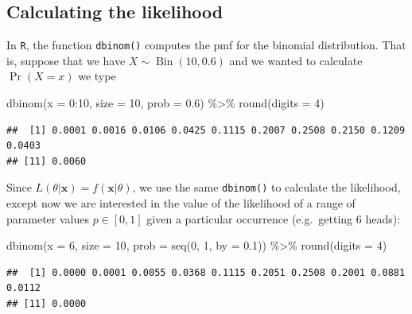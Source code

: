 \documentclass[
]{book}
\newenvironment{Shaded}{\begin{snugshade}}{\end{snugshade}}
\newcommand{\AttributeTok}[1]{\textcolor[rgb]{0.77,0.63,0.00}{#1}}
\newcommand{\DecValTok}[1]{\textcolor[rgb]{0.00,0.00,0.81}{#1}}
\newcommand{\FloatTok}[1]{\textcolor[rgb]{0.00,0.00,0.81}{#1}}
\newcommand{\FunctionTok}[1]{\textcolor[rgb]{0.00,0.00,0.00}{#1}}
\newcommand{\NormalTok}[1]{#1}
\newcommand{\SpecialCharTok}[1]{\textcolor[rgb]{0.00,0.00,0.00}{#1}}
\newcommand{\bx}{{\boldsymbol x}}
\DeclareMathOperator{\Bin}{Bin}
\theoremstyle{definition}
\theoremstyle{definition}
\theoremstyle{definition}
\theoremstyle{definition}
\theoremstyle{remark}
\begin{document}
\hypertarget{calculating-the-likelihood}{%
\subsection{Calculating the likelihood}\label{calculating-the-likelihood}}

In \texttt{R}, the function \texttt{dbinom()} computes the pmf for the binomial distribution. That is, suppose that we have \(X\sim\Bin(10,0.6)\) and we wanted to calculate \(\Pr(X=x)\) we type

\begin{Shaded}
\begin{Highlighting}[]
\FunctionTok{dbinom}\NormalTok{(}\AttributeTok{x =} \DecValTok{0}\SpecialCharTok{:}\DecValTok{10}\NormalTok{, }\AttributeTok{size =} \DecValTok{10}\NormalTok{, }\AttributeTok{prob =} \FloatTok{0.6}\NormalTok{) }\SpecialCharTok{\%\textgreater{}\%} 
    \FunctionTok{round}\NormalTok{(}\AttributeTok{digits =} \DecValTok{4}\NormalTok{)}
\end{Highlighting}
\end{Shaded}

\begin{verbatim}
##  [1] 0.0001 0.0016 0.0106 0.0425 0.1115 0.2007 0.2508 0.2150 0.1209 0.0403
## [11] 0.0060
\end{verbatim}

Since \(L(\theta|\bx) = f(\bx|\theta)\), we use the same \texttt{dbinom()} to calculate the likelihood, except now we are interested in the value of the likelihood of a range of parameter values \(p\in[0,1]\) given a particular occurrence (e.g.~getting 6 heads):

\begin{Shaded}
\begin{Highlighting}[]
\FunctionTok{dbinom}\NormalTok{(}\AttributeTok{x =} \DecValTok{6}\NormalTok{, }\AttributeTok{size =} \DecValTok{10}\NormalTok{, }\AttributeTok{prob =} \FunctionTok{seq}\NormalTok{(}\DecValTok{0}\NormalTok{, }\DecValTok{1}\NormalTok{, }\AttributeTok{by =} \FloatTok{0.1}\NormalTok{)) }\SpecialCharTok{\%\textgreater{}\%} 
    \FunctionTok{round}\NormalTok{(}\AttributeTok{digits =} \DecValTok{4}\NormalTok{)}
\end{Highlighting}
\end{Shaded}

\begin{verbatim}
##  [1] 0.0000 0.0001 0.0055 0.0368 0.1115 0.2051 0.2508 0.2001 0.0881 0.0112
## [11] 0.0000
\end{verbatim}
\end{document}
